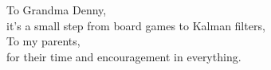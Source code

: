 \makeatletter
\let\@currsize\normalsize
\begin{frontmatter}
\makefrontmatter%

%
%
\begin{dedication} %
To Grandma Denny, \\
it's a small step from board games to Kalman filters, \\
To my parents, \\
for their time and encouragement in everything.
\end{dedication}

%
%




%


\end{frontmatter}
